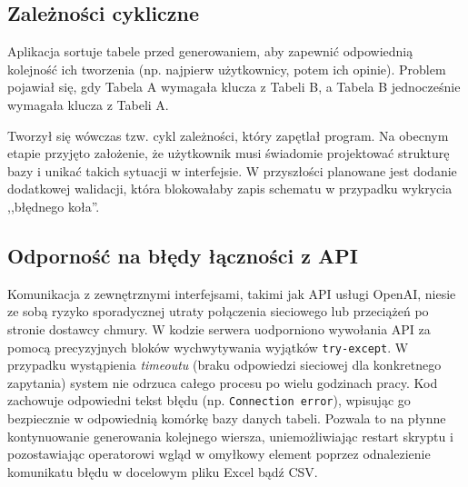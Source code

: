 \subsection*{Zależności cykliczne}
Aplikacja sortuje tabele przed generowaniem, aby zapewnić odpowiednią kolejność ich tworzenia (np. najpierw użytkownicy, potem ich opinie). Problem pojawiał się, gdy Tabela A wymagała klucza z Tabeli B, a Tabela B jednocześnie wymagała klucza z Tabeli A.

Tworzył się wówczas tzw. cykl zależności, który zapętlał program. Na obecnym etapie przyjęto założenie, że użytkownik musi świadomie projektować strukturę bazy i unikać takich sytuacji w interfejsie. W przyszłości planowane jest dodanie dodatkowej walidacji, która blokowałaby zapis schematu w przypadku wykrycia ,,błędnego koła''.

\subsection*{Odporność na błędy łączności z API}
Komunikacja z zewnętrznymi interfejsami, takimi jak API usługi OpenAI, niesie ze sobą ryzyko sporadycznej utraty połączenia sieciowego lub przeciążeń po stronie dostawcy chmury. W kodzie serwera uodporniono wywołania API za pomocą precyzyjnych bloków wychwytywania wyjątków \texttt{try-except}. W przypadku wystąpienia \textit{timeoutu} (braku odpowiedzi sieciowej dla konkretnego zapytania) system nie odrzuca całego procesu po wielu godzinach pracy. Kod zachowuje odpowiedni tekst błędu (np. \texttt{Connection error}), wpisując go bezpiecznie w odpowiednią komórkę bazy danych tabeli. Pozwala to na płynne kontynuowanie generowania kolejnego wiersza, uniemożliwiając restart skryptu i pozostawiając operatorowi wgląd w omyłkowy element poprzez odnalezienie komunikatu błędu w docelowym pliku Excel bądź CSV.
